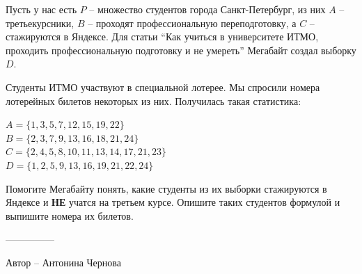 \question
Пусть у нас есть $P$ -- множество студентов города Санкт-Петербург, из них $A$ -- третьекурсники, $B$ -- проходят профессиональную переподготовку, а $C$ -- стажируются в Яндексе. Для статьи “Как учиться в университете ИТМО, проходить профессиональную подготовку и не умереть” Мегабайт создал выборку $D$.

Студенты ИТМО участвуют в специальной лотерее. Мы спросили номера лотерейных билетов некоторых из них. Получилась такая статистика:

\begin{center}
$A = \{1, 3, 5, 7, 12, 15, 19, 22\}$
\\
$B = \{2, 3, 7, 9, 13, 16, 18, 21, 24\}$
\\
$C = \{2, 4, 5, 8, 10, 11, 13, 14, 17, 21, 23\}$
\\
$D = \{1, 2, 5, 9, 13, 16, 19, 21, 22, 24\}$
\end{center}

Помогите Мегабайту понять, какие студенты из их выборки стажируются в Яндексе и \textbf{НЕ} учатся на третьем курсе. Опишите таких студентов формулой и выпишите номера их билетов.

---------------

Автор -- Антонина Чернова